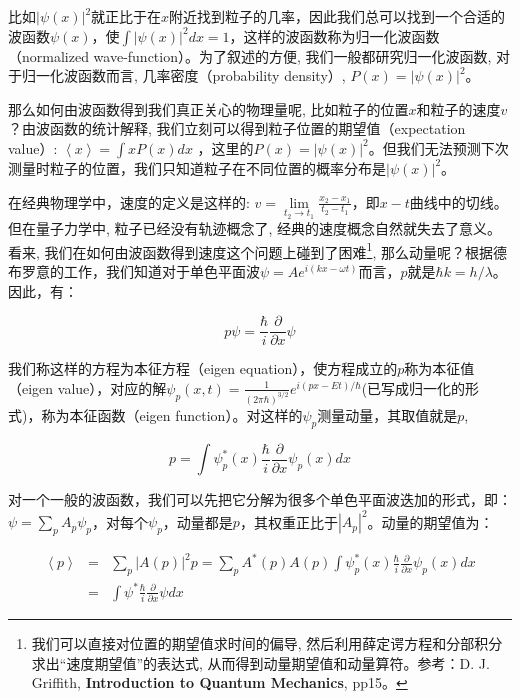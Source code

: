 
比如$\left| \psi(x)
\right|^2$就正比于在$x$附近找到粒子的几率，因此我们总可以找到一个合适的波函数$\psi(x)$，使$\int
\left| \psi(x) \right|^2 dx =
1$，这样的波函数称为归一化波函数（normalized
wave-function）。为了叙述的方便, 我们一般都研究归一化波函数,
对于归一化波函数而言, 几率密度（probability density）, $P(x) =
\left| \psi(x) \right|^2$。


那么如何由波函数得到我们真正关心的物理量呢,
比如粒子的位置$x$和粒子的速度$v$？由波函数的统计解释,
我们立刻可以得到粒子位置的期望值（expectation value）: $\left\langle
x \right\rangle  = \int {xP(x)dx} $ ，这里的$P(x) = \left| \psi(x)
\right|^2$。但我们无法预测下次测量时粒子的位置，我们只知道粒子在不同位置的概率分布是$\left|
\psi(x) \right|^2$。


在经典物理学中，速度的定义是这样的: $v =\lim \limits_{t_2 \to t_1}
\frac{x_2 - x_1}{t_2 -t_1}$，即$x-t$曲线中的切线。但在量子力学中,
粒子已经没有轨迹概念了, 经典的速度概念自然就失去了意义。看来,
我们在如何由波函数得到速度这个问题上碰到了困难\footnote{我们可以直接对位置的期望值求时间的偏导,
然后利用薛定谔方程和分部积分求出``速度期望值''的表达式,
从而得到动量期望值和动量算符。参考：D. J. Griffith,
\textbf{Introduction to Quantum Mechanics}, pp15。},
那么动量呢？根据德布罗意的工作，我们知道对于单色平面波$\psi = A e^{i
(kx - \omega t)}$而言，$p$就是$\hbar k = h/ \lambda$。因此，有：


\begin{equation*}
    p \psi =\frac{\hbar}{i} \frac{\partial}{\partial x} \psi
\end{equation*}


我们称这样的方程为本征方程（eigen
equation），使方程成立的$p$称为本征值（eigen
value），对应的解$\psi_p (x,t) = \frac{1}{(2 \pi \hbar)^{3/2}}
e^{i(px -Et)/ \hbar}$(已写成归一化的形式)，称为本征函数（eigen
function）。对这样的$\psi_p$测量动量，其取值就是$p$,


\begin{equation*}
    p = \int \psi^*_p(x) \frac{\hbar}{i} \frac{\partial}{\partial x}
\psi_p(x) dx
\end{equation*}



对一个一般的波函数，我们可以先把它分解为很多个单色平面波迭加的形式，即：$\psi
= \sum_p A_p
\psi_p$，对每个$\psi_p$，动量都是$p$，其权重正比于$\left| A_p
\right|^2$。动量的期望值为：

\begin{eqnarray*}
\left\langle p \right\rangle &=& \sum_p \left| A(p) \right|^2 p =
\sum_p A^*(p)A(p) \int \psi^*_p(x) \frac{\hbar}{i}
\frac{\partial}{\partial x} \psi_p (x) dx \\
{} & = & \int \psi^*
\frac{\hbar}{i} \frac{\partial }{\partial x} \psi dx
\end{eqnarray*}


